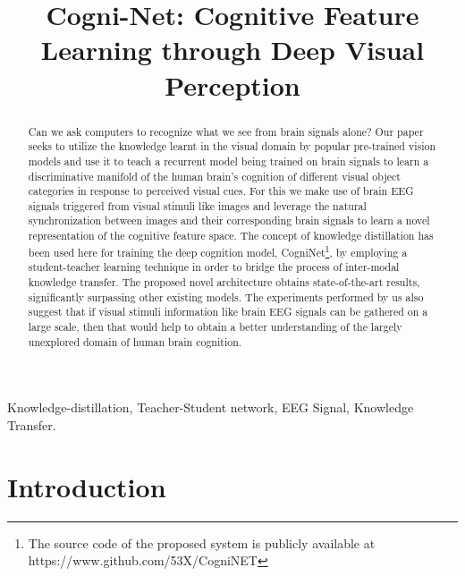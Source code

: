 \documentclass{article}
\title{Cogni-Net: Cognitive Feature Learning through Deep Visual Perception}
\begin{document}
\maketitle
\begin{abstract}
Can we ask computers to recognize what we see from brain signals alone? Our paper seeks to utilize the knowledge learnt in the visual domain by popular pre-trained vision models and use it to teach a recurrent model being trained on brain signals to learn a discriminative manifold of the human brain's cognition of different visual object categories in response to perceived visual cues. For this we make use of brain EEG signals triggered from visual stimuli like images and leverage the natural synchronization between images and their corresponding brain signals to learn a novel representation of the cognitive feature space. The concept of knowledge distillation has been used here for training the deep cognition model, CogniNet\footnote{The source code of the proposed system is publicly available at {https://www.github.com/53X/CogniNET}}, by employing a student-teacher learning technique in order to bridge the process of inter-modal knowledge transfer. The proposed novel architecture obtains state-of-the-art results, significantly surpassing other existing models. The experiments performed by us also suggest that if visual stimuli information like brain EEG signals can be gathered on a large scale, then that would help to obtain a better understanding of the largely unexplored domain of human brain cognition.
\end{abstract}

\begin{keywords}
Knowledge-distillation, Teacher-Student network, EEG Signal, Knowledge Transfer.
\end{keywords}
\section{Introduction}\label{sec:intro}
\end{document}
